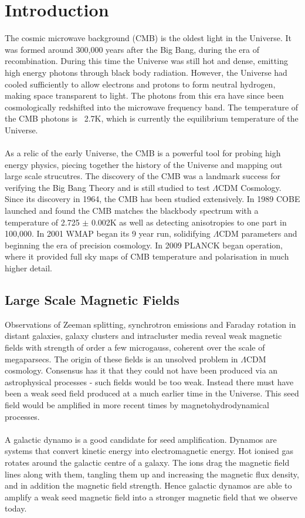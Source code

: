 \section{Introduction}

The cosmic microwave background (CMB) is the oldest light in the Universe. It was formed around 300,000 years after the Big Bang, during the era of recombination. During this time the Universe was still hot and dense, emitting high energy photons through black body radiation. However, the Universe had cooled sufficiently to allow electrons and protons to form neutral hydrogen, making space transparent to light. The photons from this era have since been cosmologically redshifted into the microwave frequency band. The temperature of the CMB photons is ~2.7K, which is currently the equilibrium temperature of the Universe. 
\\\\
As a relic of the early Universe, the CMB is a powerful tool for probing high energy physics, piecing together the history of the Universe and mapping out large scale strucutres. The discovery of the CMB was a landmark success for verifying the Big Bang Theory and is still studied to test $\Lambda$CDM Cosmology. Since its discovery in 1964, the CMB has been studied extensively. In 1989 COBE launched and found the CMB matches the blackbody spectrum with a temperature of 2.725 $\pm$ 0.002K as well as detecting anisotropies to one part in 100,000. In 2001 WMAP began its 9 year run, solidifying $\Lambda$CDM parameters and beginning the era of precision cosmology. In 2009 PLANCK began operation, where it provided full sky maps of CMB temperature and polarisation in much higher detail.

\subsection{Large Scale Magnetic Fields}

Observations of Zeeman splitting, synchrotron emissions and Faraday rotation in distant galaxies, galaxy clusters and intracluster media reveal weak magnetic fields with strength of order a few microgauss, coherent over the scale of megaparsecs. The origin of these fields is an unsolved problem in $\Lambda$CDM cosmology. Consensus has it that they could not have been produced via an astrophysical processes - such fields would be too weak. Instead there must have been a weak seed field produced at a much earlier time in the Universe. This seed field would be amplified in more recent times by magnetohydrodynamical processes.
\\\\
A galactic dynamo is a good candidate for seed amplification. Dynamos are systems that convert kinetic energy into electromagnetic energy. Hot ionised gas rotates around the galactic centre of a galaxy. The ions drag the magnetic field lines along with them, tangling them up and increasing the magnetic flux density, and in addition the magnetic field strength. Hence galactic dynamos are able to amplify a weak seed magnetic field into a stronger magnetic field that we observe today.





